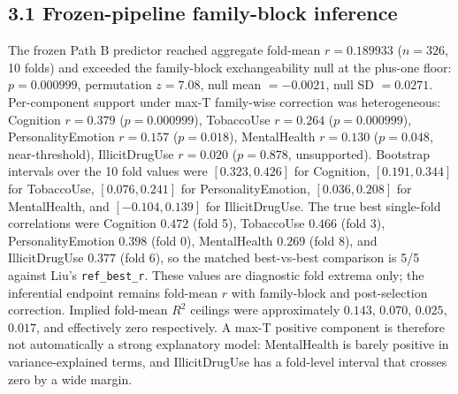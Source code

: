 \documentclass[11pt,letterpaper]{report}
\begin{document}
\subsection*{3.1 Frozen-pipeline family-block inference}

The frozen Path B predictor reached aggregate fold-mean $r = 0.189933$ ($n = 326$, 10 folds) and exceeded the family-block exchangeability null at the plus-one floor: $p = 0.000999$, permutation $z = 7.08$, null mean $= -0.0021$, null SD $= 0.0271$. Per-component support under max-T family-wise correction was heterogeneous: Cognition $r = 0.379$ ($p = 0.000999$), TobaccoUse $r = 0.264$ ($p = 0.000999$), PersonalityEmotion $r = 0.157$ ($p = 0.018$), MentalHealth $r = 0.130$ ($p = 0.048$, near-threshold), IllicitDrugUse $r = 0.020$ ($p = 0.878$, unsupported). Bootstrap intervals over the 10 fold values were $[0.323, 0.426]$ for Cognition, $[0.191, 0.344]$ for TobaccoUse, $[0.076, 0.241]$ for PersonalityEmotion, $[0.036, 0.208]$ for MentalHealth, and $[-0.104, 0.139]$ for IllicitDrugUse. The true best single-fold correlations were Cognition $0.472$ (fold 5), TobaccoUse $0.466$ (fold 3), PersonalityEmotion $0.398$ (fold 0), MentalHealth $0.269$ (fold 8), and IllicitDrugUse $0.377$ (fold 6), so the matched best-vs-best comparison is 5/5 against Liu's \texttt{ref\_best\_r}. These values are diagnostic fold extrema only; the inferential endpoint remains fold-mean $r$ with family-block and post-selection correction. Implied fold-mean $R^{2}$ ceilings were approximately $0.143$, $0.070$, $0.025$, $0.017$, and effectively zero respectively. A max-T positive component is therefore not automatically a strong explanatory model: MentalHealth is barely positive in variance-explained terms, and IllicitDrugUse has a fold-level interval that crosses zero by a wide margin.
\end{document}
